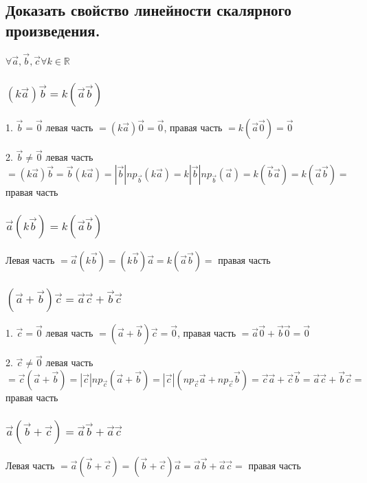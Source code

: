 \documentclass[a4paper, 10pt]{article}
\begin{document}
\subsection{Доказать свойство линейности скалярного произведения.}

\begin{center}
    $\forall \vec{a}, \vec{b}, \vec{c} \forall k \in \mathbb{R}$
\end{center}

\subsubsection{$(k\vec{a})\vec{b} = k(\vec{a}\vec{b})$}

1. $\vec{b} = \vec{0}$ левая часть $ = (k\vec{a})\vec{0} = \vec{0}$, правая часть $ = k(\vec{a}\vec{0}) = \vec{0}$

2. $\vec{b} \ne \vec{0}$ левая часть $ = (k\vec{a})\vec{b} = \vec{b}(k\vec{a}) = |\vec{b}|np_{\vec{b}}(k\vec{a}) =
k|\vec{b}|np_{\vec{b}}(\vec{a}) = k(\vec{b}\vec{a}) = k(\vec{a}\vec{b}) = $ правая часть

\subsubsection{$\vec{a}(k\vec{b}) = k(\vec{a}\vec{b})$}

Левая часть $ = \vec{a}(k\vec{b}) = (k\vec{b})\vec{a} = k(\vec{a}\vec{b}) = $ правая часть

\subsubsection{$(\vec{a} + \vec{b})\vec{c} = \vec{a}\vec{c} + \vec{b}\vec{c}$}

1. $\vec{c} = \vec{0}$ левая часть $ = (\vec{a} + \vec{b})\vec{c} = \vec{0}$, 
правая часть $ = \vec{a}\vec{0} + \vec{b}\vec{0} = \vec{0}$

2. $\vec{c} \ne \vec{0}$ левая часть $ = \vec{c}(\vec{a} + \vec{b}) = |\vec{c}|np_{\vec{c}}(\vec{a} + \vec{b}) =
|\vec{c}|(np_{\vec{c}}\vec{a} + np_{\vec{c}}\vec{b}) = \vec{c}\vec{a} + \vec{c}\vec{b} = 
\vec{a}\vec{c} + \vec{b}\vec{c} = $ правая часть

\subsubsection{$\vec{a}(\vec{b} + \vec{c}) = \vec{a}\vec{b} + \vec{a}\vec{c}$}

Левая часть $ = \vec{a}(\vec{b} + \vec{c}) = (\vec{b} + \vec{c})\vec{a} = 
\vec{a}\vec{b} + \vec{a}\vec{c} = $ правая часть
\end{document}

